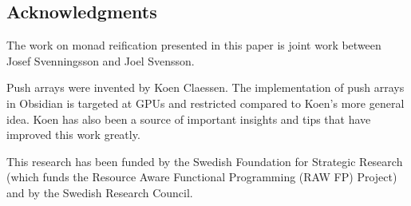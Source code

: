 




\subsection*{Acknowledgments}
The work on monad reification presented in this paper is joint 
work between Josef Svenningsson and Joel Svensson. 

Push arrays were invented by Koen Claessen. The implementation 
of push arrays in Obsidian is targeted at 
GPUs and restricted compared to Koen's more general idea. Koen has 
also been a source of important insights and tips that have
improved this work greatly. 

This research has been funded by the Swedish Foundation for
Strategic Research (which funds the Resource Aware Functional 
Programming (RAW FP) Project) and by the
Swedish Research Council.









%
